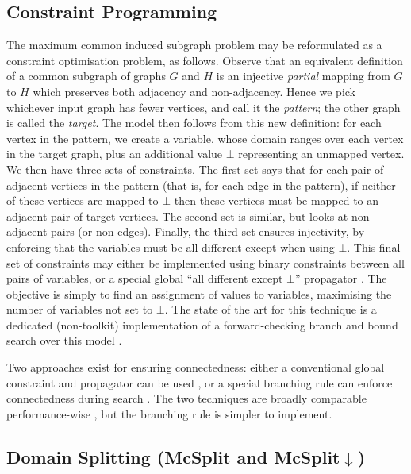 \documentclass{llncs}
\begin{document}
\subsection{Constraint Programming}

The maximum common induced subgraph problem may be reformulated as a constraint optimisation
problem, as follows.  Observe that an equivalent definition of a common subgraph of graphs $G$ and
$H$ is an injective \emph{partial} mapping from $G$ to $H$ which preserves both adjacency and
non-adjacency.  Hence we pick whichever input graph has fewer vertices, and call it the
\emph{pattern}; the other graph is called the \emph{target}. The model then follows from this new
definition: for each vertex in the pattern, we create a variable, whose domain ranges over each
vertex in the target graph, plus an additional value $\bot$ representing an unmapped vertex. We then
have three sets of constraints.  The first set says that for each pair of adjacent vertices in the
pattern (that is, for each edge in the pattern), if neither of these vertices are mapped to $\bot$
then these vertices must be mapped to an adjacent pair of target vertices. The second set is
similar, but looks at non-adjacent pairs (or non-edges).  Finally, the third set ensures
injectivity, by enforcing that the variables must be all different except when using $\bot$. This
final set of constraints may either be implemented using binary constraints between all pairs of
variables, or a special global ``all different except $\bot$'' propagator
\cite{DBLP:conf/cp/PetitRB01}. The objective is simply to find an assignment of values to
variables, maximising the number of variables not set to $\bot$. The state of the art for this
technique is a dedicated (non-toolkit) implementation of a forward-checking branch and bound search
over this model \cite{DBLP:conf/cp/NdiayeS11,DBLP:conf/cp/McCreeshNPS16}.

Two approaches exist for ensuring connectedness: either a conventional global constraint and
propagator can be used \cite{DBLP:conf/cp/McCreeshNPS16}, or a special branching rule can
enforce connectedness during search \cite{DBLP:conf/mco/VismaraV08}. The two techniques are
broadly comparable performance-wise \cite{DBLP:conf/cp/McCreeshNPS16}, but the branching rule is
simpler to implement.

\subsection{Domain Splitting (McSplit and McSplit$\downarrow$)}
\end{document}
